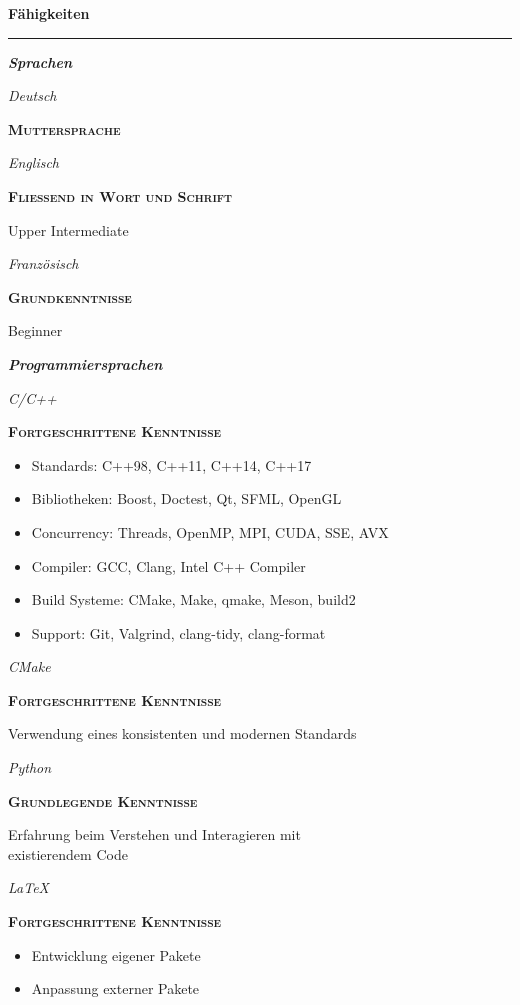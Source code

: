 \documentclass[8pt]{article}
\newcommand{\cvSectionStyle}{%
  \normalfont%
  \Large%
  \color{cvColor}%
  \bfseries%
  \sffamily%
}
\newcommand{\cvSubsectionStyle}{%
  \normalfont%
  \sffamily%
  \itshape%
  \bfseries%
  \color{cvSubsectionColor}%
}
\newcommand{\cvSection}[1]{%
  \smallskip%
  {%
    \cvSectionStyle #1%
  }\\[-0.5em]
  \rule{\linewidth}{0.8pt}%
  \par%
  \smallskip%
}
\newcommand{\cvSubsection}[1]{%
  \begin{tcolorbox}[left=0pt, top=0pt, bottom=0pt, right=0pt, boxsep=5pt, arc=5pt, frame code={}, colback=cvBackgroundColor]
    \cvSubsectionStyle #1%
  \end{tcolorbox}
}
\newenvironment{cvItemize}{%
  \begin{itemize}[itemsep=0mm, leftmargin=4mm]
}{%
  \end{itemize}
}
\newenvironment{cvSkillItem}[2]{
  \par
  \begin{minipage}[c]{0.2\linewidth}
    \raggedleft
    \normalfont
    \sffamily
    \itshape
    #1
  \end{minipage}
  \hspace{0.02\linewidth}
  \vrule
  \hspace{0.02\linewidth}
  \begin{minipage}[t]{0.74\linewidth}
    \sffamily\textsc{\color{cvColor} \textbf{#2}}\par
    \normalfont\footnotesize\sffamily\color{cvContentColor}
}{
  \end{minipage}
  \par%
  \vspace{\baselineskip}%
}
\begin{document}
  \cvSection{Fähigkeiten}
    \cvSubsection{Sprachen}
      \vspace{-1.8em}
      \begin{multicols}{2}
        \begin{cvSkillItem}{Deutsch}{Muttersprache}
        \end{cvSkillItem}
        \begin{cvSkillItem}{Englisch}{Fließend in Wort und Schrift}
          Upper Intermediate
        \end{cvSkillItem}
        \begin{cvSkillItem}{Französisch}{Grundkenntnisse}
          Beginner
        \end{cvSkillItem}
      \end{multicols}

    \cvSubsection{Programmiersprachen}
      \vspace{-1.8em}
      \begin{multicols}{2}
        \begin{cvSkillItem}{C/C++}{Fortgeschrittene Kenntnisse}
          \begin{cvItemize}
            \item Standards: C++98, C++11, C++14, C++17
            \item Bibliotheken: Boost, Doctest, Qt, SFML, OpenGL
            \item Concurrency: Threads, OpenMP, MPI, CUDA, SSE, AVX
            \item Compiler: GCC, Clang, Intel C++ Compiler
            \item Build Systeme: CMake, Make, qmake, Meson, build2
            \item Support: Git, Valgrind, clang-tidy, clang-format
          \end{cvItemize}
        \end{cvSkillItem}
        \begin{cvSkillItem}{CMake}{Fortgeschrittene Kenntnisse}
          Verwendung eines konsistenten und modernen Standards
        \end{cvSkillItem}
        \begin{cvSkillItem}{Python}{Grundlegende Kenntnisse}
          Erfahrung beim  Verstehen und Interagieren mit \\ existierendem Code
        \end{cvSkillItem}
        \begin{cvSkillItem}{LaTeX}{Fortgeschrittene Kenntnisse}
          \begin{cvItemize}
            \item Entwicklung eigener Pakete
            \item Anpassung externer Pakete
          \end{cvItemize}
        \end{cvSkillItem}
      \end{multicols}
\end{document}
